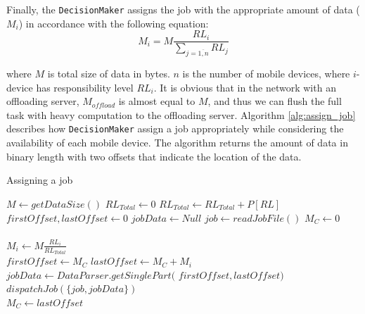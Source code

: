 \documentclass{sig-alternate}[10pt]
\begin{document}
Finally, the \texttt{DecisionMaker} assigns the job with the appropriate amount of data ($M_{i}$) in accordance with the following equation:
\begin{equation} 
\label{eq:data_amount}
M_{i} = M\frac{RL_{i}}{\sum_{j = \overline{1,n}}{RL_{j}}}
\end{equation}

\noindent where $M$ is total size of data in bytes. $n$ is the number of mobile devices, where $i$-device has responsibility level $RL_{i}$. It is obvious that in the network with an offloading server, $M_{offload}$ is almost equal to $M$, and thus we can flush the full task with heavy computation to the offloading server. Algorithm \ref{alg:assign_job} describes how \texttt{DecisionMaker} assign a job appropriately while considering the availability of each mobile device. The algorithm returns the amount of data in binary length with two offsets that indicate the location of the data.

\begin{algorithm}
\caption{Assigning a job}
\label{alg:assign_job}
\begin{algorithmic}[1]
\begin{scriptsize}
\State $M \leftarrow {getDataSize()}$
\State $RL_{Total} \leftarrow 0$ 
  \State $RL_{Total} \leftarrow RL_{Total} + P[RL]$
\EndFor
\\
\State $firstOffset, lastOffset \leftarrow 0$
\State $jobData \leftarrow Null$
\State $job \leftarrow {readJobFile()}$
\State $M_{C} \leftarrow 0$
\\
\\
  \State $M_{i} \leftarrow M\frac{RL_{i}}{RL_{Total}}$\\
  \State $firstOffset \leftarrow M_{C} $
  \State $lastOffset \leftarrow M_{C} + M_{i}$
  \State $jobData \leftarrow DataParser.getSinglePart($
  \State 
		\hspace{\algorithmicindent}
		\hspace{\algorithmicindent}
		\hspace{\algorithmicindent}
		\hspace{\algorithmicindent}
		\hspace{\algorithmicindent}
						$firstOffset, lastOffset)$
  \State $dispatchJob(\{job, jobData\})$\\
  \State $M_{C} \leftarrow lastOffset$
  
\EndFor

\EndFunction
\end{scriptsize}
\end{algorithmic}
\end{algorithm}
\end{document}
